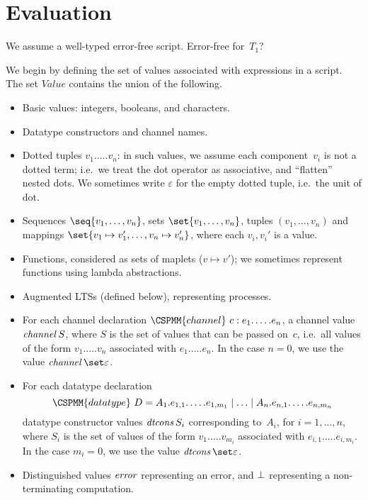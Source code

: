 \section{Evaluation}

We assume a well-typed error-free script.  \framebox{**} Error-free for~$T_1$? 


We begin by defining the set of values associated with expressions in a
script.  The set $Value$ contains the union of the following. 
%
\begin{itemize}
\item Basic values: integers, booleans, and characters.

\item Datatype constructors and channel names.

\item Dotted tuples $v_1.\ldots.v_n$: in such values, we assume each
  component~$v_i$ is not a dotted term; i.e.~we treat the dot operator as
  associative, and ``flatten'' nested dots.  We sometimes write $\varepsilon$
  for the empty dotted tuple, i.e.~the unit of dot.

\item Sequences $\seq{v_1,\ldots,v_n}$, sets
  $\set{v_1,\ldots,v_n}$, tuples $(v_1,\ldots,v_n)$ and mappings
  $\set{v_1 \mapsto v_1', \ldots, v_n \mapsto v_n'}$, where each $v_i, v_i'$
  is a value.

\item Functions, considered as sets of maplets ($v \mapsto v'$); we sometimes
  represent functions using lambda abstractions.

\item Augmented LTSs (defined below), representing processes.

\item For each channel declaration $\CSPMM{channel}~c : e_1.\ldots.e_n$, a
  channel value $\mathop{\it channel} S$, where $S$ is the set of values that can be
  passed on~$c$, i.e.~all values of the form $v_1.\ldots.v_n$ associated with
  $e_1.\ldots.e_n$.  In the case $n=0$, we use the value
  $\channel \set\varepsilon$.  

\item For each datatype declaration
\[
\CSPMM{datatype}~D = 
  A_1.e_{1,1}.\ldots.e_{1,m_1} \mid \ldots \mid A_n.e_{n,1}.\ldots.e_{n,m_n}
\]
datatype constructor values $\mathop{\it dtcons} S_i$ corresponding to~$A_i$, for
$i = 1,\ldots,n$, where $S_i$ is the set of values of the form
$v_1.\ldots.v_{m_i}$ associated with $e_{i,1}.\ldots.e_{i,m_i}$.  In the case
$m_i=0$, we use the value $\dtcons\set\varepsilon$.

\item Distinguished values $\mathord{\it error}$ representing an error, and $\perp$
  representing a non-terminating computation.
\end{itemize}


